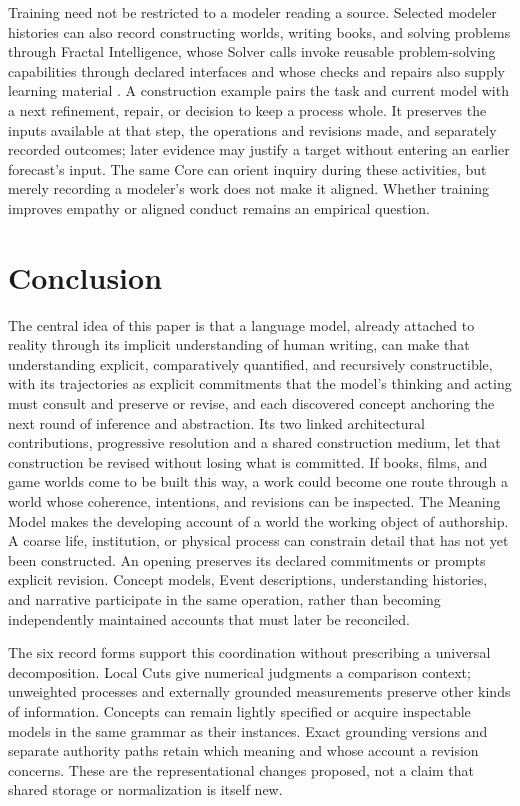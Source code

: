 \documentclass[11pt,a4paper]{article}
\begin{document}
Training need not be restricted to a modeler reading a source. Selected modeler
histories can also record constructing worlds, writing books, and solving
problems through Fractal Intelligence, whose Solver calls invoke reusable
problem-solving capabilities through declared interfaces and whose checks and
repairs also supply learning material
\cite{westerbergLifeSimulation2026,westerbergFractal2026}. A construction
example pairs the task and current model with a next refinement, repair, or
decision to keep a process whole. It preserves the inputs available at that step, the
operations and revisions made, and separately recorded outcomes; later evidence
may justify a target without entering an earlier forecast's input. The same Core
can orient inquiry during these activities, but merely recording a modeler's
work does not make it aligned. Whether training improves empathy or aligned
conduct remains an empirical question.

\section{Conclusion}
\label{sec:conclusion}

The central idea of this paper is that a language model, already attached to
reality through its implicit understanding of human writing, can make that
understanding
explicit, comparatively quantified, and recursively constructible, with its
trajectories as explicit commitments that the model's thinking and acting must
consult and preserve or revise, and each discovered concept anchoring the next
round of inference and abstraction. Its two linked architectural contributions, progressive resolution and a shared
construction medium, let that construction be revised without losing what is
committed. If books, films, and game worlds come to be built this way, a work
could become one route through a world whose coherence, intentions, and
revisions can be inspected. The Meaning Model makes the developing account of a world the
working object of authorship. A coarse life, institution, or physical process can constrain detail that has
not yet been constructed. An opening preserves its declared commitments or
prompts explicit revision. Concept models, Event descriptions, understanding
histories, and narrative participate in the same operation, rather than
becoming independently maintained accounts that must later be reconciled.

The six record forms support this coordination without prescribing a universal
decomposition. Local Cuts give numerical judgments a comparison context;
unweighted processes and externally grounded measurements preserve other kinds
of information. Concepts can remain lightly specified or acquire inspectable
models in the same grammar as their instances. Exact grounding versions and
separate authority paths retain which meaning and whose account a revision
concerns. These are the representational changes proposed, not a claim that
shared storage or normalization is itself new.
\end{document}
